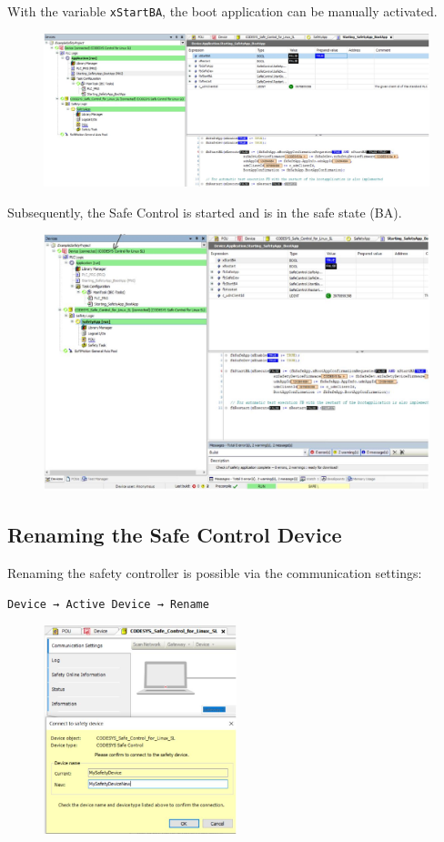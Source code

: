 \documentclass[a4paper,12pt]{article}
\begin{document}
\newpage
With the variable \texttt{xStartBA}, the boot application can be manually activated.
\begin{figure}[H]
	\centering
	\includegraphics[width=1\textwidth]{e25.JPG}
\end{figure}
Subsequently, the Safe Control is started and is in the safe state (BA).
\begin{figure}[H]
	\centering
	\includegraphics[width=1\textwidth]{e26.JPG}
\end{figure}


\subsection{Renaming the Safe Control Device}

Renaming the safety controller is possible via the communication settings:

\texttt{Device → Active Device → Rename}
\begin{figure}[H]
	\centering
	\includegraphics[width=0.5\textwidth]{17.JPG}
\end{figure}
\end{document}
